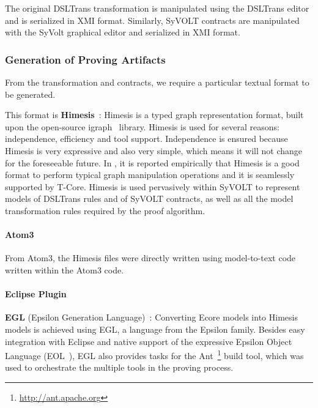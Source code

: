   The original DSLTrans transformation is manipulated using the DSLTrans editor
  and is serialized in XMI format. Similarly, SyVOLT contracts are manipulated with the SyVolt graphical
  editor and serialized in XMI format.
  
  
\subsubsection{Generation of Proving Artifacts}

From the transformation and contracts, we require a particular textual format to be generated.

This format is \textbf{Himesis}~\cite{Provost2006}: Himesis is a typed graph representation
  format, built upon the open-source igraph~\cite{igraphTool} library. 
Himesis is used for several reasons: independence, efficiency and
tool support.
Independence is ensured because Himesis is very expressive and also
very simple, which means it will not change for the foreseeable
future.
In \cite{Syriani2010b}, it is reported empirically that Himesis is a good format to perform typical graph
manipulation operations and it is seamlessly supported by T-Core.
  Himesis is used pervasively within SyVOLT to represent models of 
  DSLTrans rules and of SyVOLT contracts, as well as all the model
  transformation rules required by the proof algorithm.


\paragraph{Atom3}

From Atom3, the Himesis files were directly written using model-to-text code written within the Atom3 code.

\paragraph{Eclipse Plugin}

\textbf{EGL} (Epsilon Generation Language)~\cite{eglTool}: Converting
  Ecore models into Himesis models is achieved using EGL, a language from the
  Epsilon family. Besides easy integration with Eclipse and native support of
  the expressive
Epsilon Object Language (EOL~\cite{Kolovos}), EGL also provides tasks for the
Ant~\footnote{\url{http://ant.apache.org}} build tool, which was used to
orchestrate the multiple tools in the proving process.

